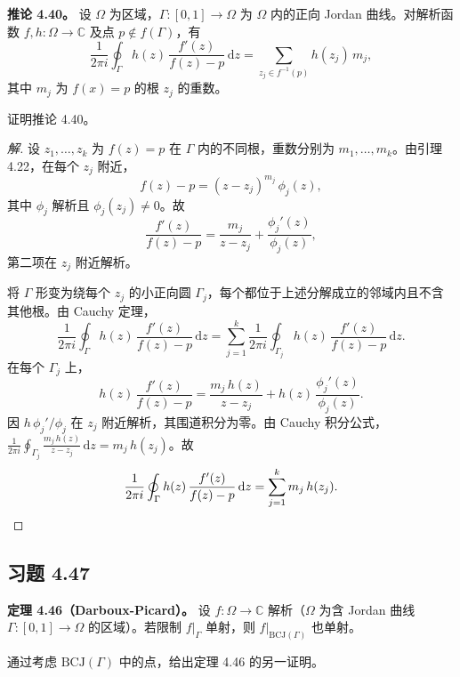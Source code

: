 \documentclass[11pt,a4paper]{article}
\newcommand{\C}{\mathbb{C}}
\newcommand{\dd}{\mathrm{d}}
\theoremstyle{definition}
\newenvironment{solution}{\begin{proof}[解]}{\end{proof}}
\begin{document}
\textbf{推论 4.40。}
设 $\Omega$ 为区域，$\Gamma : [0, 1] \to \Omega$ 为 $\Omega$ 内的正向 Jordan 曲线。对解析函数 $f, h : \Omega \to \C$ 及点 $p \notin f(\Gamma)$，有
\[
  \frac{1}{2\pi i} \oint_\Gamma h(z)\,\frac{f'(z)}{f(z) - p}\,\dd z
  = \sum_{z_j \in f^{-1}(p)} h(z_j)\,m_j,
\]
其中 $m_j$ 为 $f(x) = p$ 的根 $z_j$ 的重数。

证明推论 4.40。

\begin{solution}
  设 $z_1, \ldots, z_k$ 为 $f(z) = p$ 在 $\Gamma$ 内的不同根，重数分别为 $m_1, \ldots, m_k$。由引理 4.22，在每个 $z_j$ 附近，
  \[
    f(z) - p = (z - z_j)^{m_j}\,\phi_j(z),
  \]
  其中 $\phi_j$ 解析且 $\phi_j(z_j) \ne 0$。故
  \[
    \frac{f'(z)}{f(z) - p}
    = \frac{m_j}{z - z_j} + \frac{\phi_j'(z)}{\phi_j(z)},
  \]
  第二项在 $z_j$ 附近解析。

  将 $\Gamma$ 形变为绕每个 $z_j$ 的小正向圆 $\Gamma_j$，每个都位于上述分解成立的邻域内且不含其他根。由 Cauchy 定理，
  \[
    \frac{1}{2\pi i}\oint_\Gamma h(z)\,\frac{f'(z)}{f(z)-p}\,\dd z
    = \sum_{j=1}^{k}
      \frac{1}{2\pi i}\oint_{\Gamma_j}
      h(z)\,\frac{f'(z)}{f(z)-p}\,\dd z.
  \]
  在每个 $\Gamma_j$ 上，
  \[
    h(z)\,\frac{f'(z)}{f(z) - p}
    = \frac{m_j\,h(z)}{z - z_j}
    + h(z)\,\frac{\phi_j'(z)}{\phi_j(z)}.
  \]
  因 $h\,\phi_j'/\phi_j$ 在 $z_j$ 附近解析，其围道积分为零。由 Cauchy 积分公式，$\frac{1}{2\pi i}\oint_{\Gamma_j} \frac{m_j\,h(z)}{z - z_j}\,\dd z = m_j\,h(z_j)$。故
  \[
    \frac{1}{2\pi i}\oint_\Gamma
    h(z)\,\frac{f'(z)}{f(z) - p}\,\dd z
    = \sum_{j=1}^{k} m_j\,h(z_j).\qedhere
  \]
\end{solution}

\subsection{习题 4.47}

\textbf{定理 4.46（Darboux-Picard）。}
设 $f : \Omega \to \C$ 解析（$\Omega$ 为含 Jordan 曲线 $\Gamma : [0, 1] \to \Omega$ 的区域）。若限制 $f|_\Gamma$ 单射，则 $f|_{\mathrm{BCJ}(\Gamma)}$ 也单射。

通过考虑 $\mathrm{BCJ}(\Gamma)$ 中的点，给出定理 4.46 的另一证明。
\end{document}
